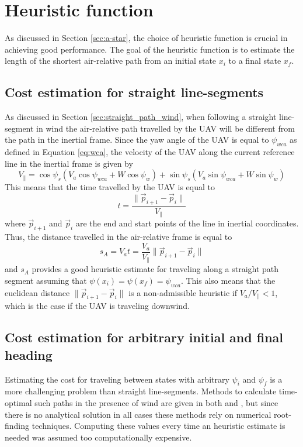 \section{Heuristic function}
As discussed in Section \ref{sec:a-star}, the choice of heuristic function is 
crucial in achieving good performance. The goal of the heuristic function is to estimate the 
length of the shortest air-relative path from an initial state $x_i$ to a final state $x_f$.

\subsection{Cost estimation for straight line-segments}
As discussed in Section \ref{sec:straight_path_wind}, when following a straight line-segment in wind the air-relative 
path travelled by the UAV will be different from the path in the inertial frame. Since the yaw angle of the UAV is 
equal to $\psi_{wca}$ as defined in Equation \eqref{eq:wca}, the velocity of the UAV along the current reference line in the inertial frame is given by 
\begin{equation}
    V_{\parallel}=\cos\psi_s(V_a\cos\psi_{wca}+W\cos\psi_w) + \sin\psi_s(V_a\sin\psi_{wca}+W\sin\psi_w)
\end{equation}
This means that the time travelled by the UAV is equal to 
\begin{equation}
    t=\frac{\|\vec{p}_{i+1}-\vec{p}_i\|}{V_\parallel}
\end{equation}
where $\vec{p}_{i+1}$ and $\vec{p}_i$ are the end and start points of the line in inertial coordinates. Thus, the distance 
travelled in the air-relative frame is equal to 
\begin{equation}
    s_A=V_at=\frac{V_a}{V_\parallel}\|\vec{p}_{i+1}-\vec{p}_{i}\|
\end{equation}
and $s_A$ provides a good heuristic estimate for traveling along a straight path segment assuming that $\psi(x_i)=\psi(x_f)=\psi_{wca}$.
This also means that the euclidean distance $\|\vec{p}_{i+1}-\vec{p}_{i}\|$ is a non-admissible heuristic if 
$V_a/V_\parallel<1$, which is the case if the UAV is traveling downwind.

\subsection{Cost estimation for arbitrary initial and final heading}
Estimating the cost for traveling between states with arbitrary $\psi_i$ and $\psi_f$ is a more challenging problem than straight line-segments.
Methods to calculate time-optimal such paths in the presence of wind are given in both \cite{optimal_path_target} and \cite{optimal_path_trochoidal}, 
but since there is no analytical solution in all cases these methods rely on numerical root-finding techniques.
Computing these values every time an heuristic estimate is needed was assumed too computationally expensive.


